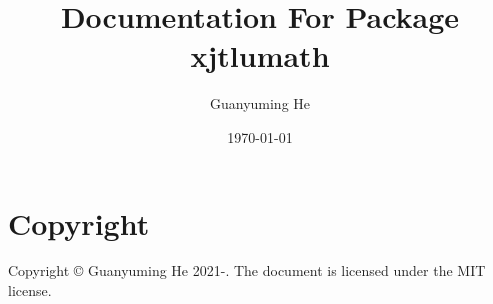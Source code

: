 \documentclass{article}
\title{Documentation For Package xjtlumath}
\author{Guanyuming He}
\date{\today}
\newcommand{\mycprt}{Copyright \copyright{} Guanyuming He 2021-\the\year.}
\begin{document}
\maketitle

\vfill
\section*{Copyright}
\mycprt{} The document is licensed under the MIT license.

\cleardoublepage
{}
\tableofcontents



 
\end{document}
